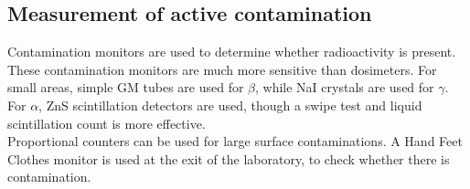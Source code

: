 \subsection{Measurement of active contamination}
Contamination monitors are used to determine whether radioactivity is present. These contamination monitors are much more sensitive than dosimeters. For small areas, simple GM tubes are used for $\beta$, while NaI crystals are used for $\gamma$. For $\alpha$, ZnS scintillation detectors are used, though a swipe test and liquid scintillation count is more effective. \\
Proportional counters can be used for large surface contaminations. A Hand Feet Clothes monitor is used at the exit of the laboratory, to check whether there is contamination.
